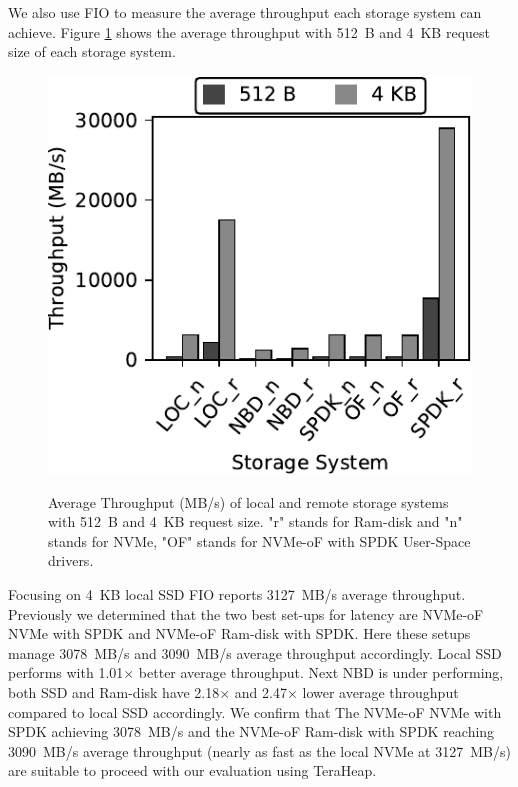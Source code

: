 We also use FIO to measure the average throughput each storage system can achieve. Figure \ref{fig:fio_th} shows the average throughput with \SI{512}{B} and \SI{4}{KB} request size of each storage system. 
\begin{figure}[H]
  \includegraphics[width=\linewidth]{figures/fio_th.pdf}\\
\caption{Average Throughput (MB/s) of local and remote storage systems with \SI{512}{B} and \SI{4}{KB} request size. "r" stands for Ram-disk and "n" stands for NVMe, "OF" stands for NVMe-oF with SPDK User-Space drivers.}
\label{fig:fio_th}
\end{figure}
Focusing on \SI{4}{KB} local SSD FIO reports \SI{3127}{MB/s} average throughput. Previously we determined that the two best set-ups for latency are NVMe-oF NVMe with SPDK and NVMe-oF Ram-disk with SPDK. Here these setups manage \SI{3078}{MB/s} and \SI{3090}{MB/s} average throughput accordingly. Local SSD performs with 1.01$\times$ better average throughput. Next NBD is under performing, both SSD and Ram-disk have 2.18$\times$ and 2.47$\times$ lower average throughput compared to local SSD accordingly. We confirm that The NVMe-oF NVMe with SPDK achieving \SI{3078}{MB/s} and the
NVMe-oF Ram-disk with SPDK reaching \SI{3090}{MB/s} average throughput (nearly as fast
as the local NVMe at \SI{3127}{MB/s}) are suitable to proceed with our
evaluation using TeraHeap.

